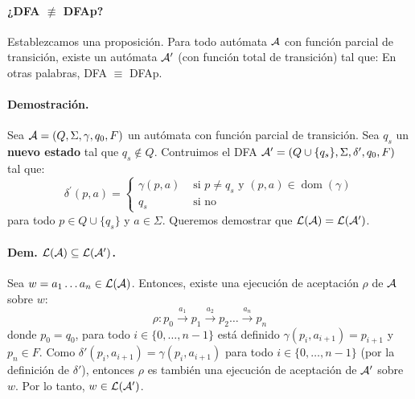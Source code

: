 \paragraph{¿DFA $\not\equiv$ DFAp?} Establezcamos una proposición. Para todo autómata $\mathcal{A}$ con función parcial de transición, existe un autómata $\mathcal{A}'$ (con función total de transición) tal que:
En otras palabras, DFA $\equiv$ DFAp.

\paragraph{Demostración.} Sea $\mathcal{A} = (Q,\Sigma,\gamma,q_0,F)$ un autómata con función parcial de transición. Sea $q_s$ un \textbf{nuevo estado} tal que $q_s \notin Q$. Contruimos el DFA $\mathcal{A}' = (Q \cup \{q_s\}, \Sigma, \delta', q_0, F)$ tal que:
$$
    \delta^{\prime}(p, a)= \begin{cases}\gamma(p, a) & \text { si } p \neq q_s \text{ y }(p, a) \in \operatorname{dom}(\gamma) \\ q_s & \text { si no }\end{cases}
$$
para todo $p \in Q \cup \{q_s\}$ y $a \in \Sigma$. Queremos demostrar que $\mathcal{L}(\mathcal{A}) = \mathcal{L}(\mathcal{A}')$.

\paragraph{Dem. $\mathcal{L}(\mathcal{A}) \subseteq \mathcal{L}(\mathcal{A}')$.} Sea $w = a_1\ldots a_n \in \mathcal{L}(\mathcal{A})$. Entonces, existe una ejecución de aceptación $\rho$ de $\mathcal{A}$ sobre $w$:
$$
    \rho: p_0 \stackrel{a_1}{\rightarrow} p_1 \stackrel{a_2}{\rightarrow} p_2 \ldots \overset{a_n}{\rightarrow} p_n
$$
donde $p_0 = q_0$, para todo $i \in \{0,\ldots,n-1\}$ está definido $\gamma(p_i,a_{i+1}) = p_{i+1}$ y $p_n \in F$. Como $\delta'(p_i, a_{i+1}) = \gamma(p_i,a_{i+1})$ para todo $i \in \{0,\ldots,n-1\}$ (por la definición de $\delta'$), entonces $\rho$ es también una ejecución de aceptación de $\mathcal{A}'$ sobre $w$. Por lo tanto, $w \in \mathcal{L}(\mathcal{A}')$.

